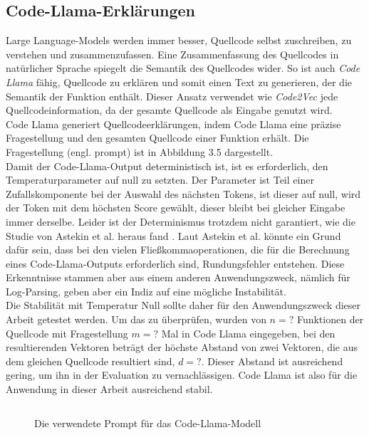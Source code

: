 \documentclass[12pt,letterpaper,ngerman]{article}
\begin{document}
\subsection{Code-Llama-Erklärungen}
Large Language-Models werden immer besser, Quellcode selbst
zuschreiben, zu verstehen und zusammenzufassen. Eine Zusammenfassung des Quellcodes
in natürlicher Sprache spiegelt die Semantik des Quellcodes wider.
So ist auch \textit{Code Llama} fähig, Quellcode zu erklären und
somit einen Text zu generieren, der die Semantik der Funktion 
enthält. Dieser Ansatz verwendet wie \textit{Code2Vec} 
jede Quellcodeinformation, da der 
gesamte Quellcode als Eingabe genutzt wird.\\
Code Llama generiert Quellcodeerklärungen, indem Code Llama eine präzise 
Fragestellung und den gesamten Quellcode einer Funktion erhält.
Die Fragestellung (engl. prompt) ist in Abbildung 3.5 dargestellt.\\
Damit der Code-Llama-Output deterministisch ist,
ist es erforderlich, den Temperaturparameter auf null zu setzten. 
Der Parameter ist Teil einer Zufallskomponente bei der
Auswahl des nächsten Tokens, ist dieser auf null,
wird der Token mit dem höchsten Score gewählt, dieser 
bleibt bei gleicher Eingabe immer derselbe. Leider ist der
Determinismus trotzdem nicht garantiert, 
wie die Studie von Astekin et al. heraus fand
\cite{llmstable}. Laut Astekin et al. könnte ein Grund dafür sein,
dass bei den vielen Fließkommaoperationen, die für die Berechnung
eines Code-Llama-Outputs erforderlich sind,
Rundungsfehler entstehen. Diese Erkenntnisse stammen aber 
aus einem anderen Anwendungszweck, nämlich für Log-Parsing, 
geben aber ein Indiz auf eine mögliche Instabilität.\\
Die Stabilität mit Temperatur Null sollte daher für den
Anwendungszweck dieser Arbeit getestet werden. Um das zu
überprüfen, wurden von $n = ?$ Funktionen der Quellcode mit 
Fragestellung $m = ?$ Mal in Code Llama eingegeben, bei den 
resultierenden Vektoren beträgt der höchste Abstand von zwei 
Vektoren, die aus dem gleichen Quellcode resultiert sind, $d = ?$.
Dieser Abstand ist ausreichend gering, um ihn in der Evaluation 
zu vernachlässigen. Code Llama ist also für die Anwendung 
in dieser Arbeit ausreichend stabil.
\begin{figure}
  \begin{center}
    \begin{minipage}[c]{6cm}
        \centering
        \inputminted[fontsize=\small]{python}{prompt.py}
    \end{minipage}
  \end{center}
  \caption{Die verwendete Prompt für das Code-Llama-Modell }
\end{figure}
\pagebreak
\end{document}
